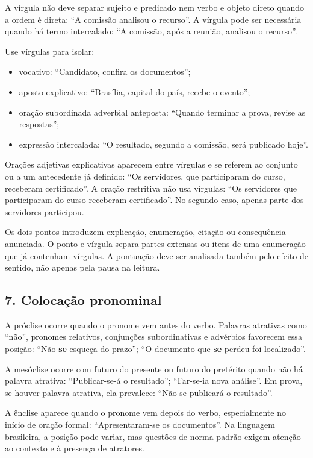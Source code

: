 \documentclass[11pt,a4paper]{article}
\begin{document}
A vírgula não deve separar sujeito e predicado nem verbo e objeto direto quando a ordem é direta: “A comissão analisou o recurso”. A vírgula pode ser necessária quando há termo intercalado: “A comissão, após a reunião, analisou o recurso”.

Use vírgulas para isolar:

\begin{itemize}
  \item vocativo: “Candidato, confira os documentos”;
  \item aposto explicativo: “Brasília, capital do país, recebe o evento”;
  \item oração subordinada adverbial anteposta: “Quando terminar a prova, revise as respostas”;
  \item expressão intercalada: “O resultado, segundo a comissão, será publicado hoje”.
\end{itemize}

Orações adjetivas explicativas aparecem entre vírgulas e se referem ao conjunto ou a um antecedente já definido: “Os servidores, que participaram do curso, receberam certificado”. A oração restritiva não usa vírgulas: “Os servidores que participaram do curso receberam certificado”. No segundo caso, apenas parte dos servidores participou.

Os dois-pontos introduzem explicação, enumeração, citação ou consequência anunciada. O ponto e vírgula separa partes extensas ou itens de uma enumeração que já contenham vírgulas. A pontuação deve ser analisada também pelo efeito de sentido, não apenas pela pausa na leitura.

\subsection*{7. Colocação pronominal}

A próclise ocorre quando o pronome vem antes do verbo. Palavras atrativas como “não”, pronomes relativos, conjunções subordinativas e advérbios favorecem essa posição: “Não \textbf{se} esqueça do prazo”; “O documento que \textbf{se} perdeu foi localizado”.

A mesóclise ocorre com futuro do presente ou futuro do pretérito quando não há palavra atrativa: “Publicar-se-á o resultado”; “Far-se-ia nova análise”. Em prova, se houver palavra atrativa, ela prevalece: “Não se publicará o resultado”.

A ênclise aparece quando o pronome vem depois do verbo, especialmente no início de oração formal: “Apresentaram-se os documentos”. Na linguagem brasileira, a posição pode variar, mas questões de norma-padrão exigem atenção ao contexto e à presença de atratores.
\end{document}
